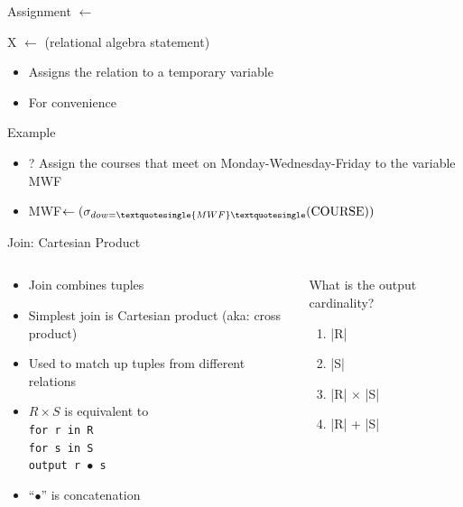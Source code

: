 \documentclass[aspectratio=169]{beamer}
\newenvironment{noindentitemize}
{ \begin{itemize}
 \setlength{\itemsep}{1.5ex}
  \setlength{\parsep}{0pt}   
  \setlength{\parskip}{0pt}
 \addtolength{\leftskip}{-2em}
 }
{ \end{itemize} }
\newcommand{\COURSE}{\textrm{COURSE}}
\begin{document}
\begin{frame}{Assignment $\leftarrow$}

X $\leftarrow$ (relational algebra statement)
\begin{noindentitemize}
\item Assigns the relation to a temporary variable
\item For convenience
\end{noindentitemize}
\vspace{2em}
Example
\begin{noindentitemize}
\item[?] Assign the courses that meet on Monday-Wednesday-Friday to the variable MWF

\item MWF$\leftarrow (\sigma_{dow = \textquotesingle{MWF}\textquotesingle}(\COURSE))$
\end{noindentitemize}
\end{frame}




\begin{frame}{Join: Cartesian Product}

\begin{columns}[c]
\begin{column}{0.6\textwidth}
\begin{itemize}
\item Join combines tuples
\item Simplest join is Cartesian product (aka: cross product)
\item Used to match up tuples from different relations
\item $R \times S$ is equivalent to\\
	\texttt{for r in R}\\
	\hspace{1em}\texttt{for s in S}\\
	\hspace{2em}\texttt{output r $\bullet$ s}\\
\vspace{1em}
\item ``$\bullet$'' is concatenation	
\end{itemize}
\end{column}
\begin{column}{0.4\textwidth}
What is the output cardinality? %
\begin{enumerate}[A]
\item |R|
\item  |S|
\item |R| $\times$ |S|
\item |R| + |S|
\end{enumerate}
\end{column}
\end{columns}
\end{frame}
%
\end{document}

